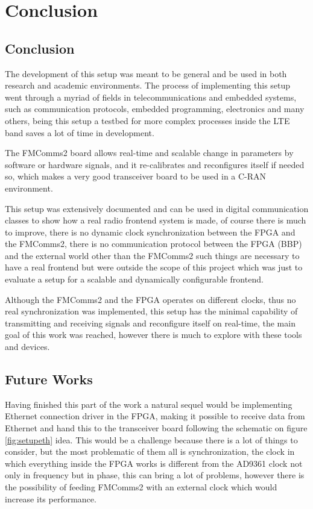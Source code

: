 \chapter{Conclusion}
\label{chap:conclusion}

\section{Conclusion}
\label{sec:conclusion}

The development of this setup was meant to be general and be used in both
research and academic environments. The process of implementing this setup went
through a myriad of fields in telecommunications and embedded systems, such as
communication protocols, embedded programming, electronics and many others,
being this setup a testbed for more complex processes inside the LTE band saves
a lot of time in development.

The FMComms2 board allows real-time and scalable change in parameters by
software or hardware signals, and it re-calibrates and reconfigures itself if
needed so, which makes a very good transceiver board to be used in a C-RAN
environment.

This setup was extensively documented and can be used in digital communication
classes to show how a real radio frontend system is made, of course there is
much to improve, there is no dynamic clock synchronization between the FPGA and
the FMComms2, there is no communication protocol between the FPGA (BBP) and the
external world other than the FMComms2 such things are necessary to have a real
frontend but were outside the scope of this project which was just to evaluate a
setup for a scalable and dynamically configurable frontend.

Although the FMComms2 and the FPGA operates on different clocks, thus no real
synchronization was implemented, this setup has the minimal capability of
transmitting and receiving signals and reconfigure itself on real-time, the main
goal of this work was reached, however there is much to explore with these tools
and devices.

\section{Future Works}
\label{sec:futurew}

Having finished this part of the work a natural sequel would be implementing
Ethernet connection driver in the FPGA, making it possible to receive data from
Ethernet and hand this to the transceiver board following the schematic on
figure \ref{fig:setupeth} idea. This would be a challenge because there is a lot
of things to consider, but the most problematic of them all is synchronization,
the clock in which everything inside the FPGA works is different from the AD9361
clock not only in frequency but in phase, this can bring a lot of problems,
however there is the possibility of feeding FMComms2 with an external clock
which would increase its performance.

